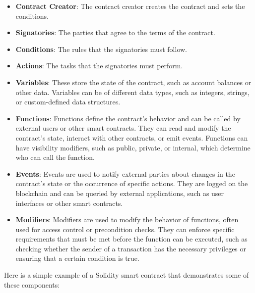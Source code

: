 \begin{itemize}
    \item \textbf{Contract Creator}: The contract creator creates the contract and sets the conditions.
    \item \textbf{Signatories}: The parties that agree to the terms of the contract.
    \item \textbf{Conditions}: The rules that the signatories must follow.
    \item \textbf{Actions}: The tasks that the signatories must perform.
    \item \textbf{Variables}: These store the state of the contract, such as account balances or other data. Variables can be of different data types, such as integers, strings, or custom-defined data structures.
    \item \textbf{Functions}: Functions define the contract's behavior and can be called by external users or other smart contracts. They can read and modify the contract's state, interact with other contracts, or emit events. Functions can have visibility modifiers, such as public, private, or internal, which determine who can call the function.
    \item \textbf{Events}: Events are used to notify external parties about changes in the contract's state or the occurrence of specific actions. They are logged on the blockchain and can be queried by external applications, such as user interfaces or other smart contracts.
    \item \textbf{Modifiers}: Modifiers are used to modify the behavior of functions, often used for access control or precondition checks. They can enforce specific requirements that must be met before the function can be executed, such as checking whether the sender of a transaction has the necessary privileges or ensuring that a certain condition is true.
\end{itemize}

Here is a simple example of a Solidity smart contract that demonstrates some of these components:

